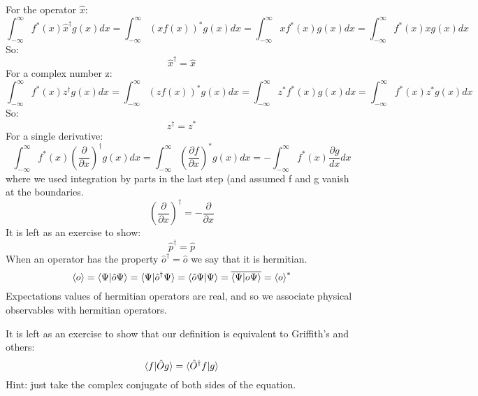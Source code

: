 \documentclass[12pt]{book}
\begin{document}
For the operator $\hat{x}$:
\begin{equation*}
\int_{-\infty}^{\infty} f^*(x)\hat{x}^\dagger g(x) dx = 
\int_{-\infty}^{\infty} \left(x f(x)\right)^* g(x) dx = 
\int_{-\infty}^{\infty} x f^*(x) g(x) dx = 
\int_{-\infty}^{\infty} f^*(x) x g(x) dx 
\end{equation*}
So:
\begin{equation}
\hat{x}^\dagger = \hat{x}
\end{equation}
For a complex number z:
\begin{equation*}
\int_{-\infty}^{\infty} f^*(x)z^\dagger g(x) dx = 
\int_{-\infty}^{\infty} \left(z f(x)\right)^* g(x) dx = 
\int_{-\infty}^{\infty} z^* f^*(x) g(x) dx = 
\int_{-\infty}^{\infty} f^*(x) z^* g(x) dx 
\end{equation*}
So:
\begin{equation}
z^\dagger = z^*
\end{equation}
For a single derivative:
\begin{equation*}
\int_{-\infty}^{\infty} f^*(x) \left( \frac{\partial}{\partial x} \right)^\dagger g(x) dx = 
\int_{-\infty}^{\infty} \left(\frac{\partial f}{\partial x}\right)^* g(x) dx = 
-\int_{-\infty}^{\infty} f^*(x) \frac{\partial g}{dx} dx  
\end{equation*}
where we used integration by parts in the last step (and assumed f and g vanish at the boundaries.
\begin{equation}
\left( \frac{\partial}{\partial x} \right)^{\dagger} = -\frac{\partial}{\partial x}
\end{equation}
It is left as an exercise to show:
\begin{equation}
\hat{p}^\dagger = \hat{p}
\end{equation}
When an operator has the property $\hat{o}^\dagger = \hat{o}$ we say that it is hermitian.  
\begin{equation}
\braket{o} = \braket{\Psi|\hat{o}\Psi} = \braket{\Psi|\hat{o}^\dagger \Psi}
= \braket{\hat{o} \Psi| \Psi} = \overline{\braket{\Psi| o \Psi}} = \braket{o}^*
\end{equation}
Expectations values of hermitian operators are real, and so we associate physical observables with hermitian operators. 

It is left as an exercise to show that our definition is equivalent to Griffith's and others:
$$\braket{f|\hat{O}g} = \braket{\hat{O}^\dagger f|g}$$
Hint: just take the complex conjugate of both sides of the equation.
\end{document}
